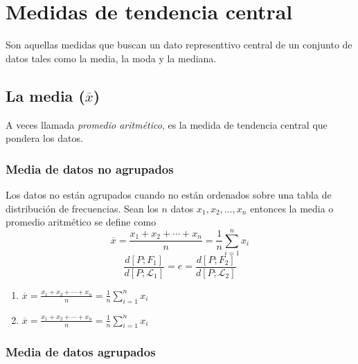 \documentclass[10pt,]{krantz}
\providecommand{\tightlist}{%
  \setlength{\itemsep}{0pt}\setlength{\parskip}{0pt}}
\theoremstyle{definition}
\theoremstyle{definition}
\theoremstyle{definition}
\theoremstyle{remark}
\begin{document}
\hypertarget{medidas-de-tendencia-central}{%
\chapter{Medidas de tendencia central}\label{medidas-de-tendencia-central}}

Son aquellas medidas que buscan un dato representtivo central de un conjunto de datos tales como la media, la moda y la mediana.

\hypertarget{la-media-overlinex}{%
\section{\texorpdfstring{La media (\(\overline{x}\))}{La media (\textbackslash{}overline\{x\})}}\label{la-media-overlinex}}

A veces llamada \emph{promedio aritmético}, es la medida de tendencia central que pondera los datos.

\hypertarget{media-de-datos-no-agrupados}{%
\subsection{Media de datos no agrupados}\label{media-de-datos-no-agrupados}}

Los datos no están agrupados cuando no están ordenados sobre una tabla de distribución de frecuencias. Sean los \(n\) datos \(x_1, x_2,\ldots, x_n\) entonces la media o promedio aritmético se define como
\begin{equation}
\overline{x}=\frac{x_1+x_2+\cdots+x_n}{n}=\frac{1}{n}\sum_{i=1}^nx_i
\label{eq:w1}
\end{equation}
\begin{equation}
\frac{d\left[P;F_1\right]}{d\left[P;\mathcal{L}_1\right]}=e=\frac{d\left[P;F_2\right]}{d\left[P;\mathcal{L}_2\right]}
\label{eq:ww}
\end{equation}

\begin{enumerate}
\def\labelenumi{\arabic{enumi}.}
\tightlist
\item
  \(\overline{x}=\frac{x_1+x_2+\cdots+x_n}{n}=\frac{1}{n}\sum_{i=1}^nx_i\)
\item
  \(\overline{x}=\frac{x_1+x_2+\cdots+x_n}{n}=\frac{1}{n}\sum_{i=1}^nx_i\)
\end{enumerate}

\hypertarget{media-de-datos-agrupados}{%
\subsection{Media de datos agrupados}\label{media-de-datos-agrupados}}
\end{document}
